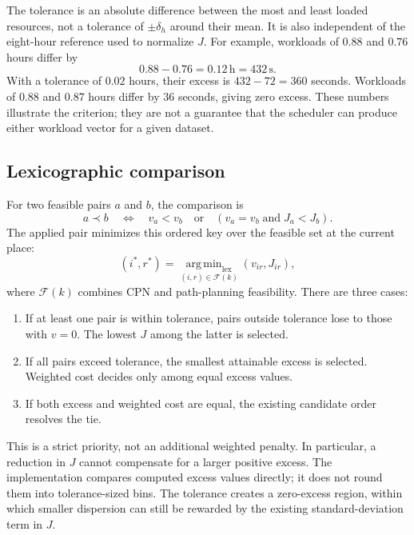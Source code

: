 The tolerance is an absolute difference between the most and least loaded
resources, not a tolerance of $\pm\delta_h$ around their mean. It is also
independent of the eight-hour reference used to normalize $J$. For example,
workloads of $0.88$ and $0.76$ hours differ by
\begin{equation}
	0.88-0.76=0.12\,\mathrm{h}=432\,\mathrm{s}.
\end{equation}
With a tolerance of $0.02$ hours, their excess is $432-72=360$ seconds.
Workloads of $0.88$ and $0.87$ hours differ by $36$ seconds, giving zero
excess. These numbers illustrate the criterion; they are not a guarantee
that the scheduler can produce either workload vector for a given dataset.

\subsection{Lexicographic comparison}

For two feasible pairs $a$ and $b$, the comparison is
\begin{equation}
	a\prec b
	\quad\Longleftrightarrow\quad
	v_a<v_b\quad\text{or}\quad(v_a=v_b\;\text{and}\;J_a<J_b).
\end{equation}
The applied pair minimizes this ordered key over the feasible set at the
current place:
\begin{equation}
	(i^*,r^*)=
	\underset{(i,r)\in\mathcal{F}(k)}{\operatorname{arg\,min}_{\mathrm{lex}}}
	\left(v_{ir},J_{ir}\right),
\end{equation}
where $\mathcal{F}(k)$ combines CPN and path-planning feasibility.
There are three cases:
\begin{enumerate}
	\item If at least one pair is within tolerance, pairs outside tolerance
	lose to those with $v=0$. The lowest $J$ among the latter is selected.
	\item If all pairs exceed tolerance, the smallest attainable excess is
	selected. Weighted cost decides only among equal excess values.
	\item If both excess and weighted cost are equal, the existing candidate
	order resolves the tie.
\end{enumerate}
This is a strict priority, not an additional weighted penalty. In particular,
a reduction in $J$ cannot compensate for a larger positive excess. The
implementation compares computed excess values directly; it does not round
them into tolerance-sized bins. The tolerance creates a zero-excess region,
within which smaller dispersion can still be rewarded by the existing
standard-deviation term in $J$.

